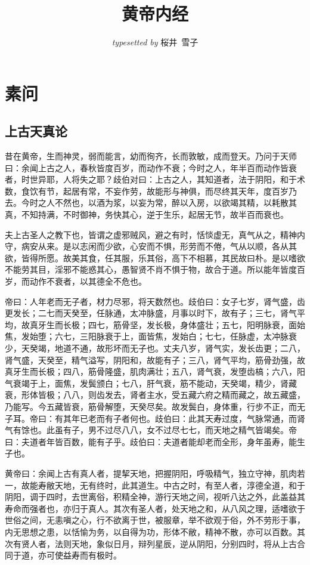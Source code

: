 \documentclass{ctexart}
\title{黄帝内经}
\author{\textit{typesetted by} 桜井\ 雪子}
\date{}
\begin{document}
\maketitle
\tableofcontents

\section{素问}

\subsection{上古天真论}

昔在黄帝，生而神灵，弱而能言，幼而徇齐，长而敦敏，成而登天。乃问于天师曰：余闻上古之人，春秋皆度百岁，而动作不衰；今时之人，年半百而动作皆衰者，时世异耶，人将失之耶？歧伯对曰：上古之人，其知道者，法于阴阳，和于术数，食饮有节，起居有常，不妄作劳，故能形与神俱，而尽终其天年，度百岁乃去。今时之人不然也，以酒为浆，以妄为常，醉以入房，以欲竭其精，以耗散其真，不知持满，不时御神，务快其心，逆于生乐，起居无节，故半百而衰也。

夫上古圣人之教下也，皆谓之虚邪贼风，避之有时，恬惔虚无，真气从之，精神内守，病安从来。是以志闲而少欲，心安而不惧，形劳而不倦，气从以顺，各从其欲，皆得所愿。故美其食，任其服，乐其俗，高下不相慕，其民故曰朴。是以嗜欲不能劳其目，淫邪不能惑其心，愚智贤不肖不惧于物，故合于道。所以能年皆度百岁，而动作不衰者，以其德全不危也。

帝曰：人年老而无子者，材力尽邪，将天数然也。歧伯曰：女子七岁，肾气盛，齿更发长；二七而天癸至，任脉通，太冲脉盛，月事以时下，故有子；三七，肾气平均，故真牙生而长极；四七，筋骨坚，发长极，身体盛壮；五七，阳明脉衰，面始焦，发始堕；六七，三阳脉衰于上，面皆焦，发始白；七七，任脉虚，太冲脉衰少，天癸竭，地道不通，故形坏而无子也。丈夫八岁，肾气实，发长齿更；二八，肾气盛，天癸至，精气溢写，阴阳和，故能有子；三八，肾气平均，筋骨劲强，故真牙生而长极；四八，筋骨隆盛，肌肉满壮；五八，肾气衰，发堕齿槁；六八，阳气衰竭于上，面焦，发鬓颁白；七八，肝气衰，筋不能动，天癸竭，精少，肾藏衰，形体皆极；八八，则齿发去，肾者主水，受五藏六府之精而藏之，故五藏盛，乃能写。今五藏皆衰，筋骨解堕，天癸尽矣。故发鬓白，身体重，行步不正，而无子耳。帝曰：有其年已老而有子者何也。歧伯曰：此其天寿过度，气脉常通，而肾气有馀也。此虽有子，男不过尽八八，女不过尽七七，而天地之精气皆竭矣。帝曰：夫道者年皆百数，能有子乎。歧伯曰：夫道者能却老而全形，身年虽寿，能生子也。

黄帝曰：余闻上古有真人者，提挈天地，把握阴阳，呼吸精气，独立守神，肌肉若一，故能寿敝天地，无有终时，此其道生。中古之时，有至人者，淳德全道，和于阴阳，调于四时，去世离俗，积精全神，游行天地之间，视听八达之外，此盖益其寿命而强者也，亦归于真人。其次有圣人者，处天地之和，从八风之理，适嗜欲于世俗之间，无恚嗔之心，行不欲离于世，被服章，举不欲观于俗，外不劳形于事，内无思想之患，以恬愉为务，以自得为功，形体不敝，精神不散，亦可以百数。其次有贤人者，法则天地，象似日月，辩列星辰，逆从阴阳，分别四时，将从上古合同于道，亦可使益寿而有极时。
\end{document}
